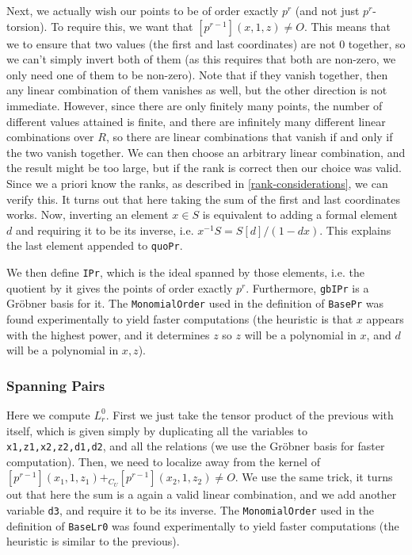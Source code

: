 Next, we actually wish our points to be of order exactly $p^r$ (and not just $p^r$-torsion).
To require this, we want that $\left[p^{r-1}\right]\left(x,1,z\right) \neq O$.
This means that we to ensure that two values (the first and last coordinates) are not $0$ together, so we can't simply invert both of them (as this requires that both are non-zero, we only need one of them to be non-zero).
Note that if they vanish together, then any linear combination of them vanishes as well, but the other direction is not immediate.
However, since there are only finitely many points, the number of different values attained is finite, and there are infinitely many different linear combinations over $R$, so there are linear combinations that vanish if and only if the two vanish together.
We can then choose an arbitrary linear combination, and the result might be too large, but if the rank is correct then our choice was valid.
Since we a priori know the ranks, as described in \ref{rank-considerations}, we can verify this.
It turns out that here taking the sum of the first and last coordinates works.
Now, inverting an element $x \in S$ is equivalent to adding a formal element $d$ and requiring it to be its inverse, i.e. $x^{-1} S = S\left[d\right]/(1 - dx)$.
This explains the last element appended to \texttt{quoPr}.

We then define \texttt{IPr}, which is the ideal spanned by those elements, i.e. the quotient by it gives the points of order exactly $p^r$.
Furthermore, \texttt{gbIPr} is a Gr\"{o}bner basis for it.
The \texttt{MonomialOrder} used in the definition of \texttt{BasePr} was found experimentally to yield faster computations (the heuristic is that $x$ appears with the highest power, and it determines $z$ so $z$ will be a polynomial in $x$, and $d$ will be a polynomial in $x,z$).

\subsubsection{Spanning Pairs}

Here we compute $L_r^0$.
First we just take the tensor product of the previous with itself, which is given simply by duplicating all the variables to \texttt{x1,z1,x2,z2,d1,d2}, and all the relations (we use the Gr\"{o}bner basis for faster computation).
Then, we need to localize away from the kernel of $\left[p^{r-1}\right]\left(x_1,1,z_1\right) +_{C_U} \left[p^{r-1}\right]\left(x_2,1,z_2\right) \neq O$.
We use the same trick, it turns out that here the sum is a again a valid linear combination, and we add another variable \texttt{d3}, and require it to be its inverse.
The \texttt{MonomialOrder} used in the definition of \texttt{BaseLr0} was found experimentally to yield faster computations (the heuristic is similar to the previous).

